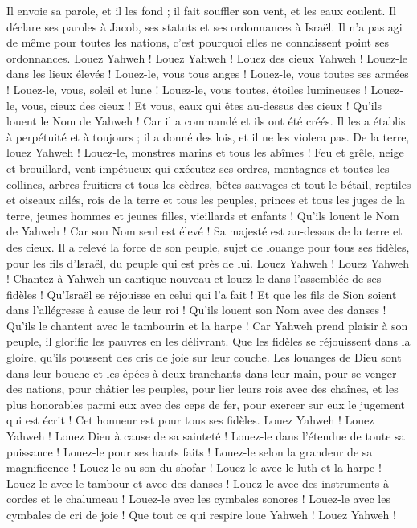 \begin{multicols}{2}
Il envoie sa parole, et il les fond ; il fait souffler son vent, et les eaux coulent.
Il déclare ses paroles à Jacob, ses statuts et ses ordonnances à Israël.
Il n'a pas agi de même pour toutes les nations, c'est pourquoi elles ne connaissent point ses ordonnances. Louez Yahweh !
\VerseOne{}Louez Yahweh ! Louez des cieux Yahweh ! Louez-le dans les lieux élevés !
Louez-le, vous tous anges ! Louez-le, vous toutes ses armées !
Louez-le, vous, soleil et lune ! Louez-le, vous toutes, étoiles lumineuses !
Louez-le, vous, cieux des cieux ! Et vous, eaux qui êtes au-dessus des cieux !
Qu’ils louent le Nom de Yahweh ! Car il a commandé et ils ont été créés.
Il les a établis à perpétuité et à toujours ; il a donné des lois, et il ne les violera pas.
De la terre, louez Yahweh ! Louez-le, monstres marins et tous les abîmes !
Feu et grêle, neige et brouillard, vent impétueux qui exécutez ses ordres,
montagnes et toutes les collines, arbres fruitiers et tous les cèdres,
bêtes sauvages et tout le bétail, reptiles et oiseaux ailés,
rois de la terre et tous les peuples, princes et tous les juges de la terre,
jeunes hommes et jeunes filles, vieillards et enfants !
Qu'ils louent le Nom de Yahweh ! Car son Nom seul est élevé ! Sa majesté est au-dessus de la terre et des cieux.
Il a relevé la force de son peuple, sujet de louange pour tous ses fidèles, pour les fils d'Israël, du peuple qui est près de lui. Louez Yahweh !
\VerseOne{}Louez Yahweh ! Chantez à Yahweh un cantique nouveau et louez-le dans l'assemblée de ses fidèles !
Qu'Israël se réjouisse en celui qui l'a fait ! Et que les fils de Sion soient dans l’allégresse à cause de leur roi !
Qu'ils louent son Nom avec des danses ! Qu'ils le chantent avec le tambourin et la harpe !
Car Yahweh prend plaisir à son peuple, il glorifie les pauvres en les délivrant.
Que les fidèles se réjouissent dans la gloire, qu’ils poussent des cris de joie sur leur couche.
Les louanges de Dieu sont dans leur bouche et les épées à deux tranchants dans leur main,
pour se venger des nations, pour châtier les peuples,
pour lier leurs rois avec des chaînes, et les plus honorables parmi eux avec des ceps de fer,
pour exercer sur eux le jugement qui est écrit ! Cet honneur est pour tous ses fidèles. Louez Yahweh !
\VerseOne{}Louez Yahweh ! Louez Dieu à cause de sa sainteté ! Louez-le dans l’étendue de toute sa puissance !
Louez-le pour ses hauts faits ! Louez-le selon la grandeur de sa magnificence !
Louez-le au son du shofar ! Louez-le avec le luth et la harpe !
Louez-le avec le tambour et avec des danses ! Louez-le avec des instruments à cordes et le chalumeau !
Louez-le avec les cymbales sonores ! Louez-le avec les cymbales de cri de joie !
Que tout ce qui respire loue Yahweh ! Louez Yahweh !
\PPE{}
\end{multicols}
